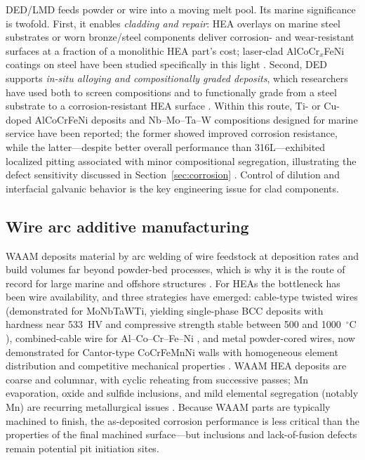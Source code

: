 DED/LMD feeds powder or wire into a moving melt pool. Its marine significance is twofold. First, it enables \emph{cladding and repair}: HEA overlays on marine steel substrates or worn bronze/steel components deliver corrosion- and wear-resistant surfaces at a fraction of a monolithic HEA part's cost; laser-clad AlCoCr$_x$FeNi coatings on steel have been studied specifically in this light \cite{jiang2019clad}. Second, DED supports \emph{in-situ alloying and compositionally graded deposits}, which researchers have used both to screen compositions and to functionally grade from a steel substrate to a corrosion-resistant HEA surface \cite{cagirici2024}. Within this route, Ti- or Cu-doped AlCoCrFeNi deposits and Nb--Mo--Ta--W compositions designed for marine service have been reported; the former showed improved corrosion resistance, while the latter---despite better overall performance than 316L---exhibited localized pitting associated with minor compositional segregation, illustrating the defect sensitivity discussed in Section~\ref{sec:corrosion} \cite{cagirici2024}. Control of dilution and interfacial galvanic behavior is the key engineering issue for clad components.

\subsection{Wire arc additive manufacturing}

WAAM deposits material by arc welding of wire feedstock at deposition rates and build volumes far beyond powder-bed processes, which is why it is the route of record for large marine and offshore structures \cite{raultaiwade2021}. For HEAs the bottleneck has been wire availability, and three strategies have emerged: cable-type twisted wires (demonstrated for MoNbTaWTi, yielding single-phase BCC deposits with hardness near 533~HV and compressive strength stable between 500 and 1000~$^{\circ}$C \cite{liu2021waam}), combined-cable wire for Al--Co--Cr--Fe--Ni \cite{shen2021ccw}, and metal powder-cored wires, now demonstrated for Cantor-type CoCrFeMnNi walls with homogeneous element distribution and competitive mechanical properties \cite{andersson2026waam}. WAAM HEA deposits are coarse and columnar, with cyclic reheating from successive passes; Mn evaporation, oxide and sulfide inclusions, and mild elemental segregation (notably Mn) are recurring metallurgical issues \cite{andersson2026waam,raultaiwade2021}. Because WAAM parts are typically machined to finish, the as-deposited corrosion performance is less critical than the properties of the final machined surface---but inclusions and lack-of-fusion defects remain potential pit initiation sites.


